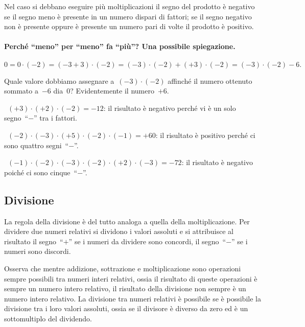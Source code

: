 Nel caso si debbano eseguire più moltiplicazioni il segno del prodotto è negativo se il segno meno è presente
in un numero dispari di fattori; se il segno negativo non è presente oppure è presente un numero pari di volte il prodotto è positivo.

\paragraph{Perché ``meno'' per ``meno'' fa ``più''? Una possibile spiegazione.}
\[0=0\cdot (-2) = (-3+3)\cdot (-2) = (-3)\cdot(-2)+(+3)\cdot(-2)=(-3)\cdot(-2)-6.\]

Quale valore dobbiamo assegnare a~$(-3)\cdot(-2)$ affinché il numero ottenuto sommato a~$-6$ dia~0?
Evidentemente il numero~$+6$.

\begin{exrig}
 \begin{esempio}
~$(+3)\cdot (+2)\cdot (-2) =-12$: il risultato è negativo perché vi è un solo segno~``$-$'' tra i fattori.
 \end{esempio}

 \begin{esempio}
~$(-2)\cdot (-3)\cdot (+5)\cdot (-2)\cdot (-1) = +60$: il risultato è positivo perché ci sono quattro segni~``$-$''.
 \end{esempio}

 \begin{esempio}
~$(-1)\cdot (-2)\cdot (-3)\cdot (-2)\cdot (+2)\cdot (-3) = -72$: il risultato è negativo poiché ci sono cinque~``$-$''.
 \end{esempio}
\end{exrig}

\ovalbox{\risolvii \ref{ese:2.16}, \ref{ese:2.17}, \ref{ese:2.18}}

\subsection{Divisione}

La regola della divisione è del tutto analoga a quella della moltiplicazione.
Per dividere due numeri relativi si dividono i valori assoluti e si attribuisce
al risultato il segno~``$+$'' se i numeri da dividere sono concordi, il segno~``$-$'' se i numeri sono discordi.

Osserva che mentre addizione, sottrazione e moltiplicazione sono operazioni sempre possibili
tra numeri interi relativi, ossia il risultato di queste operazioni è sempre un numero intero
relativo, il risultato della divisione non sempre è un numero intero relativo. La divisione
tra numeri relativi è possibile se è possibile la divisione tra i loro valori assoluti, ossia se
il divisore è diverso da zero ed è un sottomultiplo del dividendo.

